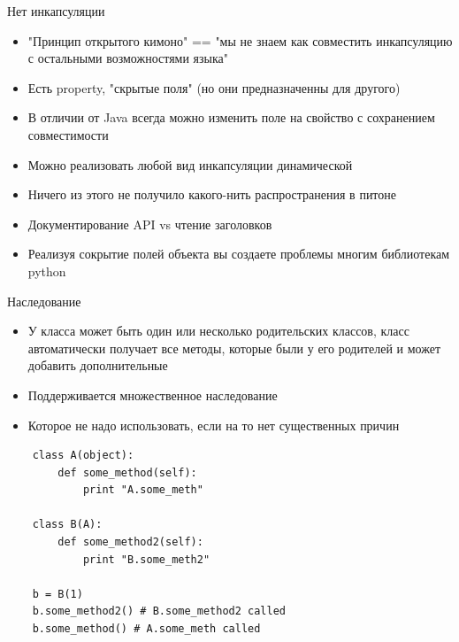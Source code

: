 \documentclass{article}
\begin{document}
\begin{center} Нет инкапсуляции \end{center}
\begin{itemize}
    \item "Принцип открытого кимоно" == 
        "мы не знаем как совместить инкапсуляцию 
        с остальными возможностями языка"
    \item Есть property, "скрытые поля" (но они предназначенны для другого)
    \item В отличии от Java всегда можно изменить поле на свойство 
            с сохранением совместимости
    \item Можно реализовать любой вид инкапсуляции динамической
    \item Ничего из этого не получило какого-нить распространения в питоне
    \item Документирование API vs чтение заголовков
    \item Реализуя сокрытие полей объекта вы 
        создаете проблемы многим библиотекам python
\end{itemize}
\newpage

\begin{center} Наследование \end{center}
\begin{itemize}
    \item У класса может быть один или несколько родительских классов, 
          класс автоматически получает все методы, которые были у его родителей
          и может добавить дополнительные
    \item Поддерживается множественное наследование
    \item Которое не надо использовать, если на то нет существенных причин
\end{itemize}

{
\Large
\vspace{15pt}
\begin{lstlisting}
    class A(object):
        def some_method(self):
            print "A.some_meth"

    class B(A):
        def some_method2(self):
            print "B.some_meth2"

    b = B(1) 
    b.some_method2() # B.some_method2 called
    b.some_method() # A.some_meth called
\end{lstlisting}
}
\end{document}
